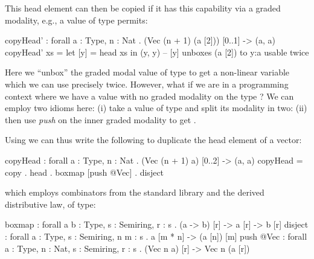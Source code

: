  This head element can then be copied
 if it has this capability via a graded modality, e.g., a value of type  permits:
 \begin{granule}
 copyHead' : forall {a : Type, n : Nat} . (Vec (n + 1) (a [2])) [0..1] -> (a, a)
 copyHead' xs = let [y] = head xs in (y, y) -- [y] unboxes (a [2]) to y:a usable twice
 \end{granule}
 Here we ``unbox'' the graded modal value of type  to
 get a non-linear variable  which we can use precisely twice.
 However, what if we are in a programming
 context where we have a value  with no
 graded modality on the type ? %
 We can employ two idioms here:
 (i) take a value of type  and
 split its modality in two: 
 (ii) then use \textit{push} on the inner graded modality
 \granin{[2]} to get
 .
 
 Using  we can thus write the following to duplicate
 the head element of a vector:
 \begin{granule}
 copyHead : forall {a : Type, n : Nat} . (Vec (n + 1) a) [0..2] -> (a, a)
 copyHead = copy . head . boxmap [push @Vec] . disject
 \end{granule}
 which employs combinators from the standard library and
 the derived distributive law, of type:
 \begin{granule}
 boxmap    : forall {a b : Type, s : Semiring, r : s}        . (a  -> b) [r] -> a [r] -> b [r]
 disject   : forall {a : Type, s : Semiring, n m : s}        . a [m * n] -> (a [n]) [m]
 push @Vec : forall {a : Type, n : Nat, s : Semiring, r : s} . (Vec n a) [r] -> Vec n (a [r])
 \end{granule}

